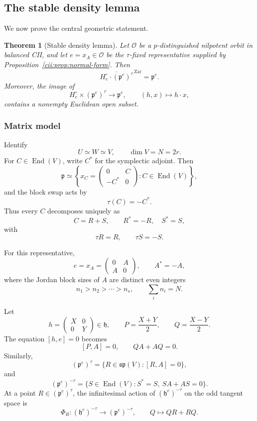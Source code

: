 \documentclass[11pt,reqno]{amsart}
\numberwithin{equation}{section}
\newtheorem{theorem}{Theorem}[section]
\theoremstyle{definition}
\theoremstyle{remark}
\newcommand{\End}{\operatorname{End}}
\begin{document}
\subsection{The stable density lemma}

We now prove the central geometric statement.

\begin{theorem}[Stable density lemma]\label{cii:thm:stable-density}
Let \(\mathcal O\) be a \(p\)-distinguished nilpotent orbit in balanced
CII, and let \(e=x_A\in\mathcal O\) be the \(\tau\)-fixed representative
supplied by Proposition~\ref{cii:prop:normal-form}.  Then
\[
\overline{
H_e^\circ\cdot(\mathfrak p^e)^\tau
}^{\,\mathrm{Zar}}
=
\mathfrak p^e.
\]
Moreover, the image of
\[
H_e^\circ\times(\mathfrak p^e)^\tau\longrightarrow\mathfrak p^e,
\qquad
(h,x)\longmapsto h\cdot x,
\]
contains a nonempty Euclidean open subset.
\end{theorem}

\subsubsection{Matrix model}

Identify
\[
U\simeq W\simeq V,
\qquad
\dim V=N=2r.
\]
For \(C\in\End(V)\), write \(C^*\) for the symplectic adjoint.
Then
\[
\mathfrak p
\simeq
\left\{
x_C=
\begin{pmatrix}
0&C\\
-C^*&0
\end{pmatrix}
:C\in\End(V)
\right\},
\]
and the block swap acts by
\[
\tau(C)=-C^*.
\]
Thus every \(C\) decomposes uniquely as
\[
C=R+S,
\qquad
R^*=-R,\quad S^*=S,
\]
with
\[
\tau R=R,\qquad
\tau S=-S.
\]

For this representative,
\[
e=x_A=
\begin{pmatrix}
0&A\\
A&0
\end{pmatrix},
\qquad
A^*=-A,
\]
where the Jordan block sizes of \(A\) are distinct even integers
\[
n_1>n_2>\cdots>n_s,
\qquad
\sum_i n_i=N.
\]

Let
\[
h=
\begin{pmatrix}
X&0\\
0&Y
\end{pmatrix}\in\mathfrak h,
\qquad
P=\frac{X+Y}{2},
\qquad
Q=\frac{X-Y}{2}.
\]
The equation \([h,e]=0\) becomes
\[
[P,A]=0,
\qquad
QA+AQ=0.
\]
Similarly,
\[
(\mathfrak p^e)^\tau
=
\{R\in\mathfrak{sp}(V):[R,A]=0\},
\]
and
\[
(\mathfrak p^e)^{-\tau}
=
\{S\in\End(V):S^*=S,\ SA+AS=0\}.
\]
At a point \(R\in(\mathfrak p^e)^\tau\), the infinitesimal action of
\((\mathfrak h^e)^{-\tau}\) on the odd tangent space is
\[
\Phi_R:
(\mathfrak h^e)^{-\tau}
\longrightarrow
(\mathfrak p^e)^{-\tau},
\qquad
Q\longmapsto QR+RQ.
\]
\end{document}
